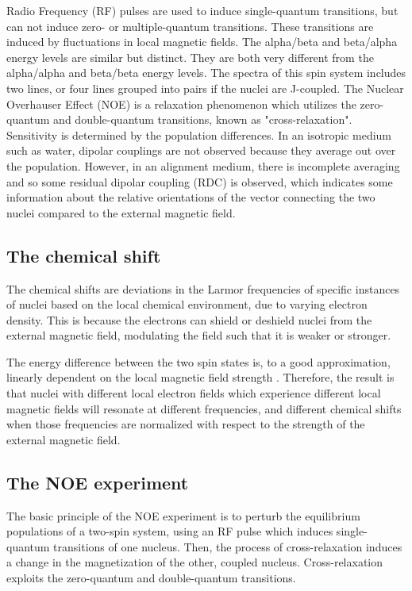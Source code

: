 Radio Frequency (RF) pulses are used to induce single-quantum transitions, 
but can not induce zero- or multiple-quantum transitions.  These transitions 
are induced by fluctuations in local magnetic fields.
The alpha/beta and beta/alpha energy levels are similar but distinct.  They are both
very different from the alpha/alpha and beta/beta energy levels.  The spectra of this
spin system includes two lines, or four lines grouped into pairs if the 
nuclei are J-coupled.
The Nuclear Overhauser Effect (NOE) is a relaxation phenomenon which utilizes 
the zero-quantum and double-quantum transitions, known as "cross-relaxation".
Sensitivity is determined by the population differences.
In an isotropic medium such as water, dipolar couplings are not observed
because they average out over the population.
However, in an alignment medium, there is incomplete averaging
and so some residual dipolar coupling (RDC) is observed, which indicates 
some information about the relative orientations of the vector connecting
the two nuclei compared to the external magnetic field.


\subsection*{The chemical shift}

The chemical shifts are deviations in the Larmor frequencies of specific 
instances of nuclei based on the local chemical environment, due to varying
electron density.  This is because the electrons can shield or deshield nuclei
from the external magnetic field, modulating the field such that it is weaker
or stronger.

The energy difference between the two spin states is, to a good approximation,
linearly dependent on the local magnetic field strength 
\cite{cavanagh1995protein}.  Therefore, the 
result is that nuclei with different local electron fields which experience
different local magnetic fields will resonate at different frequencies, and
different chemical shifts when those frequencies are normalized with respect
to the strength of the external magnetic field.

\subsection*{The NOE experiment}

The basic principle of the NOE experiment is to perturb the equilibrium 
populations of a two-spin system, using an RF pulse which induces single-quantum
transitions of one nucleus.  Then, the process of cross-relaxation induces a 
change in the magnetization of the other, coupled nucleus.  Cross-relaxation
exploits the zero-quantum and double-quantum transitions.

